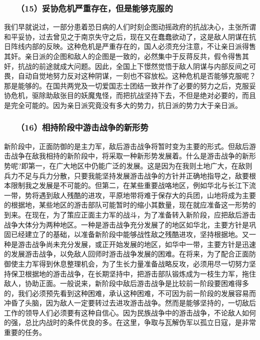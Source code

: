 \documentclass[cn,11pt,chinese]{elegantbook}
\def\myformat#1{\hfil\hfil #1}
\begin{document}
\subsubsection*{\myformat{　　（15）妥协危机严重存在，但是能够克服的}}
我们早就说过，一部分患着恐日病的人们时刻企图动摇政府的抗战决心，主张所谓和平妥协，过去曾见之于南京失守之后，现在又在蠢蠢欲动了，这是敌人阴谋在抗日阵线内部的反映。这种危机是严重存在的，国人必须充分注意，不让亲日派得售其奸。亲日派的企图和敌人的企图是一致的，必然集中于反蒋反共，假令得售其奸，抗战的前途就成大问题。因此，全国上下憬然觉悟于敌人阴谋与内部反间之可畏，自动自觉地努力反对这种阴谋，一刻也不容放松。这种危机是否能够克服呢？那是能够的。在国共两党及一切爱国志士团结一致并作了必要的努力之后，克服妥协危机，驱除助敌张目的妖魔鬼怪，而把抗战坚持下去，不但是绝对必要的，而且是完全可能的。因为亲日派究竟没有多大的势力，抗日派的势力大于亲日派。\\
\subsubsection*{\myformat{　　（16）相持阶段中游击战争的新形势}}
新阶段中，正面防御的是主力军，敌后游击战争将暂时变为主要的形式。但敌后游击战争在敌我相持的新阶段中，将采取一种新形势发展着。什么是游击战争的新形势呢?即第一，在广大地区中仍能广泛的发展。这是因为在我则土地广大，在敌则兵力不足与兵力分散，只要我能坚持发展游击战争的方针并正确地指导之，敌要根本限制我之发展是不可能的。但第二，在某些重要战咯地区，例如华北与长江下流一带，势将遇到敌人残酷的进攻，平原地带将难于保存大的兵团，山地将成为主要的根据地，某些地区的游击部队可能暂时的缩小其数量，现在就应准备这一形势的到来。在现在，为了策应正面主力军的战斗，为了准备转入新阶段，应把敌后游击战争大体分为两种地区。一种是游击战争充分发展了的地区如华北，主要方针是巩固已经建立了的基础，以准备新阶段中能够战性敌之残酷进攻，坚持根据地。又一种是游击战争尚未充分发展，或正开始发展的地区，如华中一带，主要方针是迅速的发展游击战争，以免敌人回师时游击战争发展的困难。在将来，为了配合正面防御使主力军得到休息整理机会，为了生长力量准备战略反攻，必须用尽一切努力坚持保卫根据地的游击战争，在长期坚持中，把游击部队锻炼成为一枝生力军，拖住敌人，协助正面。一般说来，新阶段中敌后游击战争是比较前一阶段要困难得多的，我们必须预先看到这种困难，承认这种困难，不可因为前一阶段的发展容易而冲昏了头脑，因为敌人一定要转过去进攻游击战争。然而是能够坚持的，一切敌后工作的领导人们必须要有这种自信心。因为民族战争中的游击战争，不论敌人如何的强，总比内战时的条件优良的多。在这里，争取与瓦解伪军以孤立日寇，是非常重要的任务。\\
\end{document}
